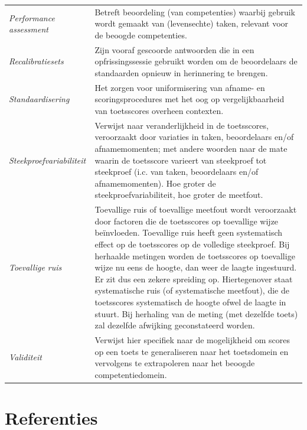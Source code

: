 \documentclass[
  letterpaper,
]{report}
\begin{document}
\begin{longtable}[]{@{}
  >{\raggedright\arraybackslash}p{}
  >{\raggedright\arraybackslash}p{}@{}}
\emph{Performance assessment} & Betreft beoordeling (van competenties)
waarbij gebruik wordt gemaakt van (levensechte) taken, relevant voor de
beoogde competenties. \\
\emph{Recalibratiesets} & Zijn vooraf gescoorde antwoorden die in een
opfrissingssessie gebruikt worden om de beoordelaars de standaarden
opnieuw in herinnering te brengen. \\
\emph{Standaardisering} & Het zorgen voor uniformisering van afname- en
scoringsprocedures met het oog op vergelijkbaarheid van toetsscores
overheen contexten. \\
\emph{Steekproefvariabiliteit} & Verwijst naar veranderlijkheid in de
toetsscores, veroorzaakt door variaties in taken, beoordelaars en/of
afnamemomenten; met andere woorden naar de mate waarin de toetsscore
varieert van steekproef tot steekproef (i.c. van taken, beoordelaars
en/of afnamemomenten). Hoe groter de steekproefvariabiliteit, hoe groter
de meetfout. \\
\emph{Toevallige ruis } & Toevallige ruis of toevallige meetfout wordt
veroorzaakt door factoren die de toetsscores op toevallige wijze
beïnvloeden. Toevallige ruis heeft geen systematisch effect op de
toetsscores op de volledige steekproef. Bij herhaalde metingen worden de
toetsscores op toevallige wijze nu eens de hoogte, dan weer de laagte
ingestuurd. Er zit dus een zekere spreiding op. Hiertegenover staat
systematische ruis (of systematische meetfout), die de toetsscores
systematisch de hoogte ofwel de laagte in stuurt. Bij herhaling van de
meting (met dezelfde toets) zal dezelfde afwijking geconstateerd
worden. \\
\emph{Validiteit} & Verwijst hier specifiek naar de mogelijkheid om
scores op een toets te generaliseren naar het toetsdomein en vervolgens
te extrapoleren naar het beoogde competentiedomein. \\
\bottomrule
\end{longtable}

\hypertarget{referenties}{%
\chapter*{Referenties}\label{referenties}}
\end{document}
